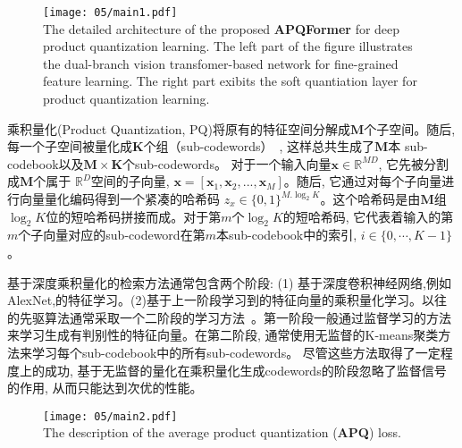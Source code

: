 \begin{figure}[!htp]
  \centering
  \texttt{[image: 05/main1.pdf]} \\
    {The detailed architecture of the proposed \textbf{APQFormer} for deep product quantization learning. The left part of the figure illustrates the dual-branch vision transfomer-based network for fine-grained feature learning. The right part exibits the soft  quantiation layer for product quantization learning. }
 \label{fig:mainapq}
\end{figure} 


乘积量化(Product Quantization, PQ)将原有的特征空间分解成$\mathbf{M}$个子空间。随后, 每一个子空间被量化成$\mathbf{K}$个组（sub-codewords）~\cite{klein2019end}, 这样总共生成了$\mathbf{M}$本 sub-codebook以及$\mathbf{M}\times\mathbf{K}$个sub-codewords。 对于一个输入向量$\mathbf{x} \in  \mathbb{R}^{MD}$, 它先被分割成$\mathbf{M}$个属于 $\mathbb{R}^D$空间的子向量, $ \mathbf{x} =  [\mathbf{x}_1,\mathbf{x}_2,...,\mathbf{x}_M]$。随后, 它通过对每个子向量进行向量量化编码得到一个紧凑的哈希码 $z_x \in \{0,1\}^{M. \log_2{K}}$。这个哈希码是由$\mathbf{M}$组$\log_2{K}$位的短哈希码拼接而成。对于第$m$个$\log_2{K}$的短哈希码, 它代表着输入的第$m$个子向量对应的sub-codeword在第$m$本sub-codebook中的索引,  $i \in \{0,\cdots,K-1\}$。\par
基于深度乘积量化的检索方法通常包含两个阶段: (1) 基于深度卷积神经网络,例如AlexNet,的特征学习。(2)基于上一阶段学习到的特征向量的乘积量化学习。以往的先驱算法通常采取一个二阶段的学习方法~\cite{yue2016deep, liu2018deep, cao2017deep}。第一阶段一般通过监督学习的方法来学习生成有判别性的特征向量。在第二阶段, 通常使用无监督的K-means聚类方法来学习每个sub-codebook中的所有sub-codewords。 尽管这些方法取得了一定程度上的成功, 基于无监督的量化在乘积量化生成codewords的阶段忽略了监督信号的作用, 从而只能达到次优的性能。 \par
\begin{figure}[!htp]
  \centering
  \texttt{[image: 05/main2.pdf]} \\
    { The description of the average product quantization (\textbf{APQ}) loss.}
 \label{fig:mainapq1}
\end{figure} 

